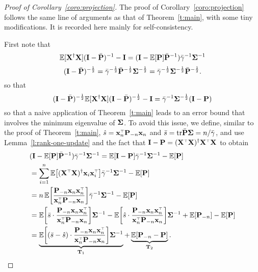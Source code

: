 \documentclass[11pt]{article}
\begin{document}
\begin{proof}[Proof of Corollary~\ref{coro:projection}]
The proof of Corollary~\ref{coro:projection} follows the same line of arguments as that of Theorem~\ref{t:main}, with some tiny modifications. It is recorded here mainly for self-consistency.

First note that
\[
  \mathbb E[\mathbf X^\dagger\mathbf X] (\mathbf I - \bar {\mathbf P})^{-1} - \mathbf I = (\mathbf I - \mathbb E[\mathbf P] \bar {\mathbf P}^{-1}) \bar \gamma^{-1} \mathbf{\Sigma}^{-1}
\]
\[
  (\mathbf I - \bar {\mathbf P})^{-\frac12} = \bar \gamma^{-\frac12} \bar {\mathbf P}^{-\frac12} \mathbf{\Sigma}^{-\frac12} = \bar \gamma^{-\frac12} \mathbf{\Sigma}^{-\frac12} \bar {\mathbf P}^{-\frac12}.
\]
so that
\[
  (\mathbf I - \bar {\mathbf P})^{-\frac12} \mathbb E[\mathbf X^\dagger\mathbf X] (\mathbf I - \bar {\mathbf P})^{-\frac12} - \mathbf I = \bar \gamma^{-1} \mathbf{\Sigma}^{-\frac12} (\mathbf I - \mathbf P) 
\]
so that a naive application of Theorem~\ref{t:main} leads to an error bound that involves the minimum eigenvalue of $\mathbf{\Sigma}$. To avoid this issue, we define, similar to the proof of Theorem~\ref{t:main}, $\hat s = \x_n^\top\P_{-n}\x_n$ and $\bar s=\mathrm{tr}\bar{\mathbf P}\mathbf{\Sigma}=n/\bar\gamma$, and use Lemma~\ref{l:rank-one-update} and the fact that $\I-\P=(\X^\top\X)^\dagger\X^\top\X$ to obtain
\begin{align*}
  &(\I - \E[\P] \bar \P^{-1}) \bar \gamma^{-1} \Sigmab^{-1} = \E[\I -\P] \bar \gamma^{-1} \Sigmab^{-1} - \E[\P]\\
  &= \sum_{i=1}^n\E\big[(\X^\top\X)^\dagger\x_i\x_i^\top\big] \bar \gamma^{-1} \Sigmab^{-1} -
    \E[\P]\\
  &=n\,\E\bigg[\frac{\P_{-n}\x_n\x_n^\top}{\x_n^\top\P_{-n}\x_n}\bigg] \bar \gamma^{-1} \Sigmab^{-1} -
    \E[\P]\\
  &=
    \E\bigg[\bar s\cdot\frac{\P_{-n}\x_n\x_n^\top }{\x_n^\top\P_{-n}\x_n}\bigg]\Sigmab^{-1} 
    - \E\bigg[\hat s
    \cdot\frac{ \P_{-n}\x_n\x_n^\top }{\x_n^\top\P_{-n}\x_n}\bigg] \Sigmab^{-1}  +
    \E[\P_{-n}]
    -\E[\P]\\
  &=\underbrace{ \E\bigg[(\bar s - \hat s)
    \cdot\frac{ \P_{-n}\x_n\x_n^\top }{\x_n^\top\P_{-n}\x_n}\bigg] \Sigmab^{-1}}_{\T_1}
+    \underbrace{\E[\P_{-n}-\P]}_{\T_2}.
\end{align*}



\end{proof}
\end{document}
